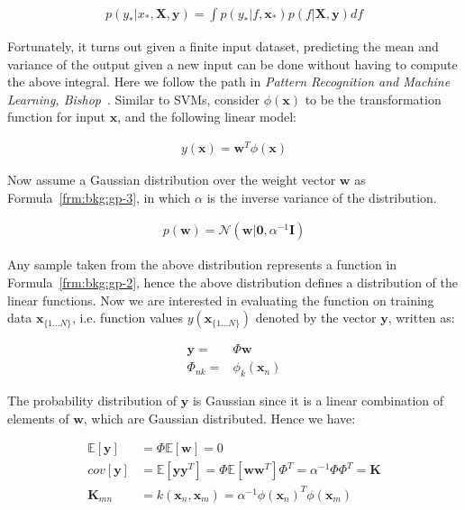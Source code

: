 \begin{align}
  p(y_*|x_*,\mathbf{X}, \mathbf{y}) = \int p(y_*|f, \mathbf{x_*})p(f|\mathbf{X}, \mathbf{y})df
  \label{frm:bkg:gp-1}
\end{align}

Fortunately, it turns out given a finite input dataset, predicting the mean and variance of the output given a new input can be done without having to compute the above integral. Here we follow the path in \emph{Pattern Recognition and Machine Learning, Bishop}~\cite{bishop2006pattern}. Similar to SVMs, consider $\phi(\mathbf{x})$ to be the transformation function for input $\mathbf{x}$, and the following linear model:

\begin{align}
  y(\mathbf{x}) = \mathbf{w}^T \phi(\mathbf{x})
  \label{frm:bkg:gp-2}
\end{align}

Now assume a Gaussian distribution over the weight vector $\mathbf{w}$ as Formula~\ref{frm:bkg:gp-3}, in which $\alpha$ is the inverse variance of the distribution.

\begin{align}
  p(\mathbf{w}) = \mathcal{N}(\mathbf{w}|\mathbf{0}, \alpha^{-1}\mathbf{I})
  \label{frm:bkg:gp-3}
\end{align}

Any sample taken from the above distribution represents a function in Formula~\ref{frm:bkg:gp-2}, hence the above distribution defines a distribution of the linear functions. Now we are interested in evaluating the function on training data $\mathbf{x}_{\{1\ldots N\}}$, i.e. function values $y(\mathbf{x}_{\{1\ldots N\}})$ denoted by the vector $\mathbf{y}$, written as:

\begin{align}
  \mathbf{y} = &\Phi\mathbf{w} \nonumber \\
  \Phi_{nk} = &\phi_k(\mathbf{x}_n)
  \label{frm:bkg:gp-4}
\end{align}

The probability distribution of $\mathbf{y}$ is Gaussian since it is a linear combination of elements of $\mathbf{w}$, which are Gaussian distributed. Hence we have:

\begin{align}
  \mathbb{E}[\mathbf{y}] & = \Phi\mathbb{E}[\mathbf{w}] = 0 \nonumber \\
  cov[\mathbf{y}] & = \mathbb{E}[\mathbf{yy}^T] = \Phi\mathbb{E}[\mathbf{ww}^T]\Phi^T = \alpha^{-1}\Phi\Phi^T = \mathbf{K} \nonumber \\
  \mathbf{K}_{mn} & = k(\mathbf{x}_n,\mathbf{x}_m) = \alpha^{-1}\phi(\mathbf{x}_n)^T\phi(\mathbf{x}_m)
  \label{frm:bkg:gp-5}
\end{align}

